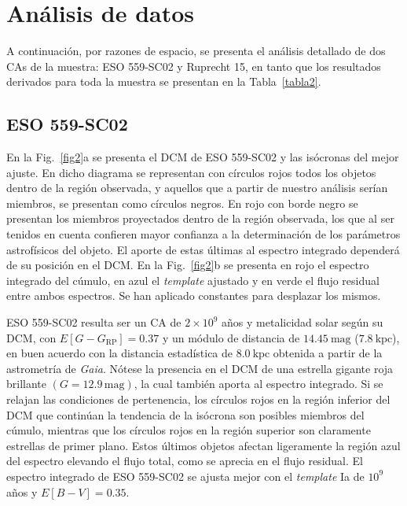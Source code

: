 \documentclass[baaa]{baaa}
\begin{document}
\section{An\'alisis de datos}\label{s_4}

A continuaci\'on, por razones de espacio, se presenta el an\'alisis detallado de dos CAs de la muestra: ESO 559-SC02 y Ruprecht 15, en tanto que los resultados derivados para toda la muestra se presentan en la Tabla~\ref{tabla2}.

\subsection{ESO 559-SC02}
En la Fig.~\ref{fig2}a se presenta el DCM de ESO 559-SC02 y las is\'ocronas del mejor ajuste. En dicho diagrama se representan con c\'irculos rojos todos los objetos dentro de la regi\'on observada, y aquellos que a partir de nuestro an\'alisis ser\'ian miembros, se presentan como c\'irculos negros. En rojo con borde negro se presentan los miembros proyectados dentro de la regi\'on observada, los que al ser tenidos en cuenta confieren mayor confianza a la determinaci\'on de los par\'ametros astrof\'isicos del objeto. El aporte de estas \'ultimas al espectro integrado depender\'a de su posici\'on en el DCM. En la Fig.~\ref{fig2}b se presenta en rojo el espectro integrado del c\'umulo, en azul el {\em template} ajustado  y en verde el flujo residual entre ambos espectros. Se han aplicado constantes para desplazar los mismos.

ESO 559-SC02 resulta ser un CA de $2 \times 10^9$ a\~nos y metalicidad solar seg\'un su DCM, con $E[G - G_\mathrm{RP}] = 0.37$ y un m\'odulo de distancia de $14.45~\mathrm{mag}$ ($7.8~\mathrm{kpc}$), en buen acuerdo con la distancia estad\'istica de $8.0~\mathrm{kpc}$ obtenida a partir de la astrometr\'ia de {\sl Gaia}. N\'otese la presencia en el DCM de una estrella gigante roja brillante $(G = 12.9\, \mathrm{mag})$, la cual tambi\'en aporta al espectro integrado. Si se relajan las condiciones de pertenencia, los c\'irculos rojos en la regi\'on inferior del DCM que contin\'uan la tendencia de la is\'ocrona son posibles miembros del c\'umulo, mientras que los c\'irculos rojos en la regi\'on superior son claramente estrellas de primer plano. Estos \'ultimos objetos afectan ligeramente la regi\'on azul del espectro elevando el flujo total, como se aprecia en el flujo residual. El espectro integrado de ESO 559-SC02 se ajusta mejor con el {\em template} Ia de $10^9$ a\~nos y $E[B - V] = 0.35$.
\end{document}
